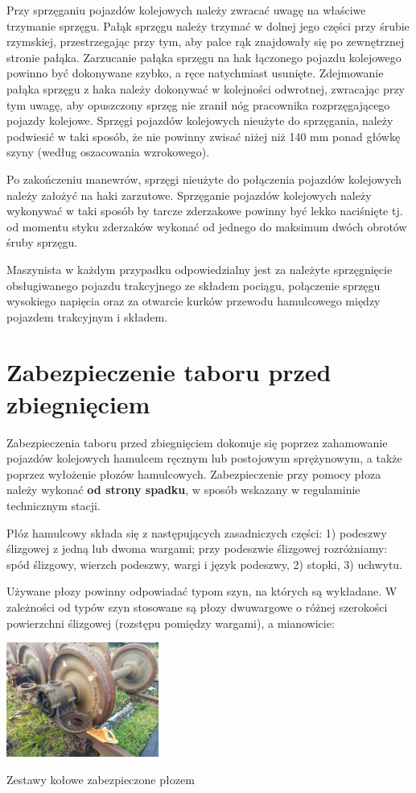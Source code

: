 Przy sprzęganiu pojazdów kolejowych należy zwracać uwagę na właściwe trzymanie sprzęgu. Pałąk sprzęgu należy trzymać w dolnej jego części przy śrubie rzymskiej, przestrzegając przy tym, aby palce rąk znajdowały się po zewnętrznej stronie pałąka. Zarzucanie pałąka sprzęgu na hak łączonego pojazdu kolejowego powinno być dokonywane szybko, a ręce natychmiast usunięte. Zdejmowanie pałąka sprzęgu z haka należy dokonywać w kolejności odwrotnej, zwracając przy tym uwagę, aby opuszczony sprzęg nie zranił nóg pracownika rozprzęgającego pojazdy kolejowe. Sprzęgi pojazdów kolejowych nieużyte do sprzęgania, należy podwiesić w taki sposób, że nie powinny zwisać niżej niż 140 mm ponad główkę szyny (według oszacowania wzrokowego). 

Po zakończeniu manewrów, sprzęgi nieużyte do połączenia pojazdów kolejowych należy założyć na haki zarzutowe. Sprzęganie pojazdów kolejowych należy wykonywać w taki sposób by tarcze zderzakowe powinny być lekko naciśnięte tj. od momentu styku zderzaków wykonać od jednego do maksimum dwóch obrotów śruby sprzęgu. 

Maszynista w każdym przypadku odpowiedzialny jest za należyte sprzęgnięcie obsługiwanego pojazdu trakcyjnego ze składem pociągu, połączenie sprzęgu wysokiego napięcia oraz za otwarcie kurków przewodu hamulcowego między pojazdem trakcyjnym i składem. 

\chapter{Zabezpieczenie taboru przed zbiegnięciem}

Zabezpieczenia taboru przed zbiegnięciem dokonuje się poprzez zahamowanie pojazdów kolejowych hamulcem ręcznym lub postojowym sprężynowym, a także poprzez wyłożenie płozów hamulcowych. Zabezpieczenie przy pomocy płoza należy wykonać \textbf{od strony spadku}, w sposób wskazany w regulaminie technicznym stacji.

Płóz hamulcowy składa się z następujących zasadniczych części:
1) podeszwy ślizgowej z jedną lub dwoma wargami; przy podeszwie ślizgowej rozróżniamy: spód ślizgowy, wierzch podeszwy, wargi i język podeszwy,
2) stopki,
3) uchwytu.

Używane płozy powinny odpowiadać typom szyn, na których są wykładane. W zależności od typów szyn stosowane są płozy dwuwargowe o różnej szerokości powierzchni ślizgowej (rozstępu pomiędzy wargami), a mianowicie:
\begin{marginfigure}
	\includegraphics[width=5cm]{skryptkierownik-img/ploz.jpg}
	\caption{Zestawy kołowe zabezpieczone płozem}
\end{marginfigure}

